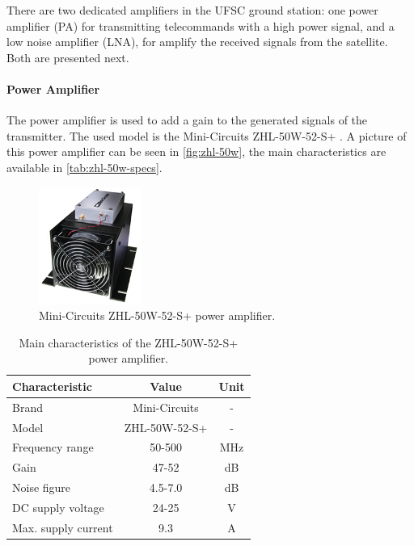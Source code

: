 There are two dedicated amplifiers in the UFSC ground station: one power amplifier (PA) for transmitting telecommands with a high power signal, and a low noise amplifier (LNA), for amplify the received signals from the satellite. Both are presented next.

\paragraph{Power Amplifier}

The power amplifier is used to add a gain to the generated signals of the transmitter. The used model is the Mini-Circuits ZHL-50W-52-S+ \cite{zhl50w}. A picture of this power amplifier can be seen in \autoref{fig:zhl-50w}, the main characteristics are available in \autoref{tab:zhl-50w-specs}.

\begin{figure}[!ht]
    \begin{center}
        \includegraphics[width=0.3\textwidth]{figures/zhl-50w.png}
        \caption{Mini-Circuits ZHL-50W-52-S+ power amplifier.}
        \label{fig:zhl-50w}
    \end{center}
\end{figure}

\begin{table}[ht]
    \centering
    \begin{tabular}{lcc}
        \toprule[1.5pt]
        \textbf{Characteristic} & \textbf{Value}    & \textbf{Unit} \\
        \midrule
        Brand                   & Mini-Circuits     & - \\
        Model                   & ZHL-50W-52-S+     & - \\
        Frequency range         & 50-500            & MHz \\
        Gain                    & 47-52             & dB \\
        Noise figure            & 4.5-7.0           & dB \\
        DC supply voltage       & 24-25             & V \\
        Max. supply current     & 9.3               & A \\
        \bottomrule[1.5pt]
    \end{tabular}
    \caption{Main characteristics of the ZHL-50W-52-S+ power amplifier.}
    \label{tab:zhl-50w-specs}
\end{table}


